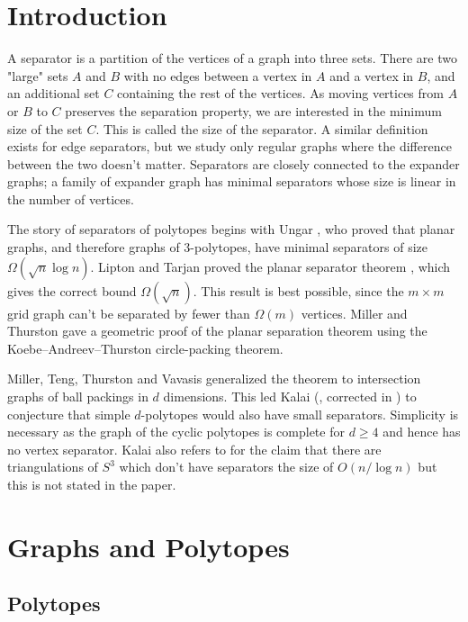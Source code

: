 \chapter{Introduction}
\label{intro}

A separator is a partition of the vertices of a graph into three sets. There are two "large" sets $A$ and $B$ with no edges
between a vertex in $A$ and a vertex in $B$, and 
an additional set $C$ containing the rest of the vertices. As moving vertices from $A$ or $B$ to
$C$ preserves the separation property, we are interested in the minimum size of the set $C$. 
This is called the size of the separator. A similar definition exists for edge separators, but we study
only regular graphs where the difference between the two doesn't matter.
Separators are closely connected to the expander graphs; a family of expander graph has minimal separators
whose size is linear in the number of vertices.



The story of separators of polytopes begins with Ungar \cite{Ungar1951},
who proved that planar graphs, and therefore graphs of 3-polytopes, have minimal 
separators of size $\Omega(\sqrt{n} \log n)$. Lipton and Tarjan proved the planar 
separator theorem  \cite{LiTa}, which gives the correct bound
$\Omega(\sqrt{n})$. This result is best possible, since the $m\times m$ grid graph
can't be separated by fewer than $\Omega(m)$ vertices. Miller and Thurston \cite{MillerThurston-separators} gave a 
geometric proof of the planar separation theorem using the  
Koebe–Andreev–Thurston circle-packing theorem.

Miller, Teng, Thurston and Vavasis \cite{MillerTengThurstonVavasis} generalized 
the theorem to intersection graphs of ball packings in $d$ dimensions. This 
led Kalai (\cite{Kal97}, corrected in \cite{kalai04:_polyt}) to conjecture that 
simple $d$-polytopes would also have small separators.
Simplicity is necessary as the graph of the cyclic polytopes is complete for 
$d\geq 4$ and hence has no vertex separator. Kalai also refers to 
\cite{MillerTengThurstonVavasis} for the claim that there are triangulations of 
$S^3$ which don't have separators the size of $O(n/\log n)$ but this is not 
stated in the paper.

\chapter{Graphs and Polytopes}
\label{mathchapter}

\section{Polytopes}

